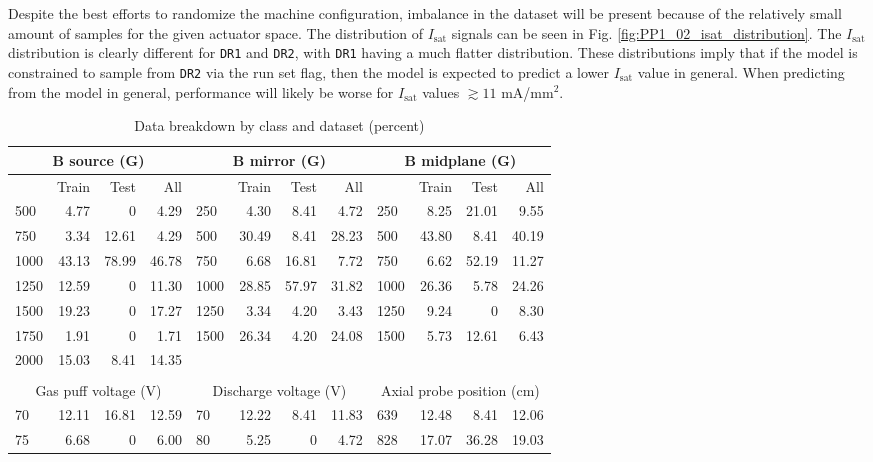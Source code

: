 Despite the best efforts to randomize the machine configuration, imbalance in the dataset will be present because of the relatively small amount of samples for the given actuator space. The distribution of $I_\text{sat}$ signals can be seen in Fig. \ref{fig:PP1_02_isat_distribution}. The $I_\text{sat}$ distribution is clearly different for \texttt{DR1} and \texttt{DR2}, with \texttt{DR1} having a much flatter distribution. These distributions imply that if the model is constrained to sample from \texttt{DR2} via the run set flag, then the model is expected to predict a lower $I_\text{sat}$ value in general. When predicting from the model in general, performance will likely be worse for $I_\text{sat}$ values $\gtrsim 11$ mA/mm$^2$. 

\begin{table}
\small
	\centering
	\caption{Data breakdown by class and dataset (percent)}
	\label{tab:data_frac}
	\begin{tabular}{lrrr|lrrr|lrrr}
		\multicolumn{4}{c|}{B source (G)} & \multicolumn{4}{c|}{B mirror (G)} & \multicolumn{4}{c}{B midplane (G)}\\
		\hline \hline
		& Train & Test & All && Train & Test & All && Train & Test & All \\
		500 & 4.77 & 0 & 4.29 & 250 & 4.30 & 8.41 & 4.72 & 250 & 8.25 & 21.01 & 9.55 \\
		750 & 3.34 & 12.61 & 4.29 & 500 & 30.49 & 8.41 & 28.23 & 500 & 43.80 & 8.41 & 40.19 \\
		1000 & 43.13 & 78.99 & 46.78 & 750 & 6.68 & 16.81 & 7.72 & 750 & 6.62 & 52.19 & 11.27 \\
		1250 & 12.59 & 0 & 11.30 & 1000 & 28.85 & 57.97 & 31.82 & 1000 & 26.36 & 5.78 & 24.26 \\
		1500 & 19.23 & 0 & 17.27 & 1250 & 3.34 & 4.20 & 3.43 & 1250 & 9.24 & 0 & 8.30 \\
		1750 & 1.91 & 0 & 1.71 & 1500 & 26.34 & 4.20 & 24.08 & 1500 & 5.73 & 12.61 & 6.43 \\
		2000 & 15.03 & 8.41 & 14.35 & & & & & & & & \\
		\\
		\multicolumn{4}{c|}{Gas puff voltage (V)} & \multicolumn{4}{c|}{Discharge voltage (V)} & \multicolumn{4}{c}{Axial probe position (cm)} \\
		\hline \hline
		70 & 12.11 & 16.81 & 12.59  & 70 & 12.22 & 8.41 & 11.83    & 639 & 12.48 & 8.41 & 12.06 \\
		75 & 6.68 & 0 & 6.00     & 80 & 5.25 & 0 & 4.72      & 828 & 17.07 & 36.28 & 19.03 \\

\end{tabular}
\end{table}
